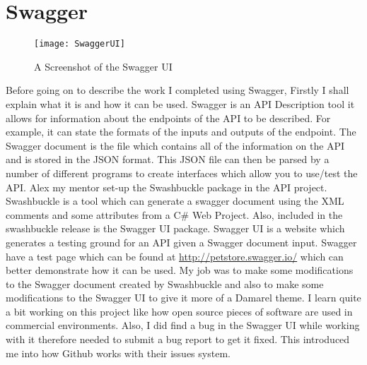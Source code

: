 \section{Swagger}{
		\begin{figure}
	\centering
	\texttt{[image: SwaggerUI]}
	\caption{A Screenshot of the Swagger UI}
	\label{fig:SwaggerUI}
\end{figure}
	Before going on to describe the work I completed using Swagger, Firstly I shall explain what it is and how it can be used. Swagger is an API Description tool it allows for information about the endpoints of the API to be described. For example, it can state the formats of the inputs and outputs of the endpoint. The Swagger document is the file which contains all of the information on the API and is stored in the JSON format. This JSON file can then be parsed by a number of different programs to create interfaces which allow you to use/test the API. Alex my mentor set-up the Swashbuckle package in the API project. Swashbuckle is a tool which can generate a swagger document using the XML comments and some attributes from a C\# Web Project. Also, included in the swashbuckle release is the Swagger UI package. Swagger UI is a website which generates a testing ground for an API given a Swagger document input. Swagger have a test page which can be found at \url{http://petstore.swagger.io/} which can better demonstrate how it can be used. My job was to make some modifications to the Swagger document created by Swashbuckle and also to make some modifications to the Swagger UI to give it more of a Damarel theme. I learn quite a bit working on this project like how open source pieces of software are used in commercial environments. Also, I  did find a bug in the Swagger UI while working with it therefore needed to submit a bug report to get it fixed. This introduced me into how Github works with their issues system.
}